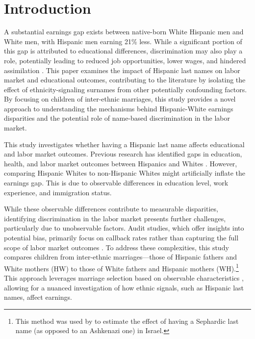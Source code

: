 \documentclass[a4paper,fleqn]{cas-sc}
\begin{document}

\section{Introduction}

A substantial earnings gap exists between native-born White Hispanic men and White men, with Hispanic men earning 21\% less. While a significant portion of this gap is attributed to educational differences, discrimination may also play a role, potentially leading to reduced job opportunities, lower wages, and hindered assimilation \citep{duncan2006hispanics, duncan2018identifying, duncan2018socioeconomic}. This paper examines the impact of Hispanic last names on labor market and educational outcomes, contributing to the literature by isolating the effect of ethnicity-signaling surnames from other potentially confounding factors. By focusing on children of inter-ethnic marriages, this study provides a novel approach to understanding the mechanisms behind Hispanic-White earnings disparities and the potential role of name-based discrimination in the labor market.

This study investigates whether having a Hispanic last name affects educational and labor market outcomes. Previous research has identified gaps in education, health, and labor market outcomes between Hispanics and Whites \citep{antman2020ethnic, davilaChangesRelativeEarnings2008}. However, comparing Hispanic Whites to non-Hispanic Whites might artificially inflate the earnings gap. This is due to observable differences in education level, work experience, and immigration status.

While these observable differences contribute to measurable disparities, identifying discrimination in the labor market presents further challenges, particularly due to unobservable factors. Audit studies, which offer insights into potential bias, primarily focus on callback rates rather than capturing the full scope of labor market outcomes \citep{bertrand2004emily}. To address these complexities, this study compares children from inter-ethnic marriages—those of Hispanic fathers and White mothers (HW) to those of White fathers and Hispanic mothers (WH).\footnote{This method was used by \citet{rubinstein2014pride} to estimate the effect of having a Sephardic last name (as opposed to an Ashkenazi one) in Israel.} This approach leverages marriage selection based on observable characteristics \citep{averettBetterWorseRelationship2008}, allowing for a nuanced investigation of how ethnic signals, such as Hispanic last names, affect earnings.
\end{document}
